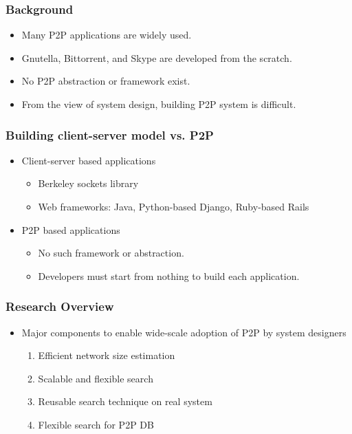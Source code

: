 \documentclass[red]{beamer}
\begin{document}
\begin{frame}
\frametitle{Background}
\begin{itemize}
\item Many P2P applications are widely used.
\item Gnutella, Bittorrent, and Skype are developed from the scratch.
\item No P2P abstraction or framework exist.
\item From the view of system design, building P2P system is difficult.
\end{itemize}
\end{frame}
\begin{frame}
\frametitle{Building client-server model vs. P2P}
\begin{itemize}
\item Client-server based applications
\begin{itemize}
\item Berkeley sockets library
\item Web frameworks: Java, Python-based Django, Ruby-based Rails
\end{itemize}
\item P2P based applications
\begin{itemize}
\item No such framework or abstraction.
\item Developers must start from nothing to build each application. 
\end{itemize}
\end{itemize}
\end{frame}
\begin{frame}
\frametitle{Research Overview}
\begin{itemize}
\item Major components to enable wide-scale adoption of P2P by system designers
\begin{enumerate}
\item Efficient network size estimation
\item Scalable and flexible search
\item Reusable search technique on real system
\item Flexible search for P2P DB
\end{enumerate}
\end{itemize}
\end{frame}
\end{document}
